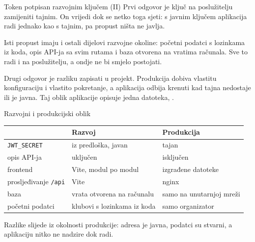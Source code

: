 \begin{frame}{Token potpisan razvojnim ključem (II)}
Prvi odgovor je ključ na poslužitelju zamijeniti tajnim. On vrijedi dok se netko toga sjeti: s javnim ključem aplikacija radi jednako kao s tajnim, pa propust ništa ne javlja.

\vspace{0.9em}
Isti propust imaju i ostali dijelovi razvojne okoline: početni podatci s lozinkama iz koda, opis API-ja sa svim rutama i baza otvorena na vratima računala. Sve to radi i na poslužitelju, a ondje ne bi smjelo postojati.

\vspace{0.9em}
Drugi odgovor je razliku zapisati u projekt. Produkcija dobiva vlastitu konfiguraciju i vlastito pokretanje, a aplikacija odbija krenuti kad tajna nedostaje ili je javna. Taj oblik aplikacije opisuje jedna datoteka, .
\end{frame}


\begin{frame}{Razvojni i produkcijski oblik}
\vspace{0.3em}
\begin{center}
{\small
\setlength{\tabcolsep}{6pt}
\renewcommand{\arraystretch}{1.3}
\begin{tabular}{@{}L{3.2cm}L{4.2cm}L{4.0cm}@{}}
  \toprule
   & \textbf{Razvoj} & \textbf{Produkcija} \\
  \midrule
  \texttt{JWT\_SECRET} & iz predloška, javan & tajan \\
  opis API-ja & uključen & isključen \\
  frontend & Vite, modul po modul & izgrađene datoteke \\
  prosljeđivanje \texttt{/api} & Vite & nginx \\
  baza & vrata otvorena na računalu & samo na unutarnjoj mreži \\
  početni podatci & klubovi s lozinkama iz koda & samo organizator \\
  \bottomrule
\end{tabular}
}
\end{center}

\vspace{0.6em}
Razlike slijede iz okolnosti produkcije: adresa je javna, podatci su stvarni, a aplikaciju nitko ne nadzire dok radi.
\end{frame}

